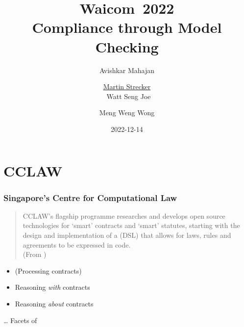 \documentclass{beamer}
\title[Compliance through Model Checking]{Waicom~2022\\Compliance through Model Checking}
\author{Avishkar Mahajan \and \underline{Martin Strecker} \\\ Watt Seng Joe \and Meng Weng Wong}
\date{2022-12-14}
\institute{Singapore Management University / Toulouse University}
\begin{document}

\begin{frame}
  \titlepage
\end{frame}


\section{CCLAW}


\begin{frame}[fragile]\frametitle{Singapore's Centre for Computational Law}

  \begin{quote}
    CCLAW's flagship programme researches and develops open source
    technologies for ‘smart’ contracts and ‘smart’ statutes, starting with the
    design and implementation of a  (DSL)
    that allows for laws, rules and agreements to be expressed in code. \\
    (From )
  \end{quote}

  \begin{itemize}
  \item (Processing contracts)
  \item Reasoning \emph{with} contracts
  \item Reasoning \emph{about} contracts
  \end{itemize}
  \dots{} Facets of 
  
\end{frame}
\end{document}
